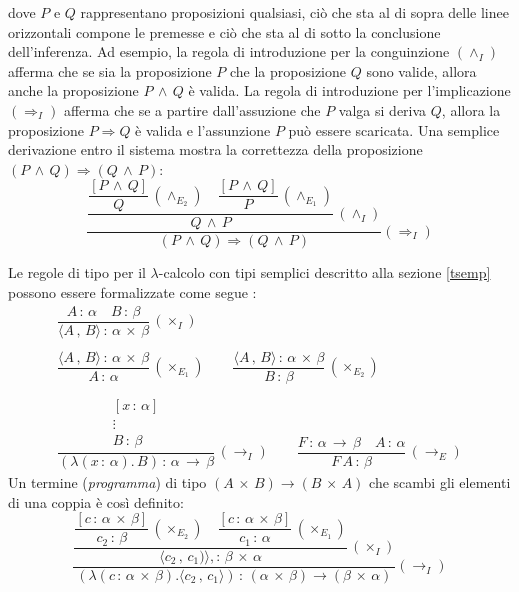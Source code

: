 dove $P$ e $Q$ rappresentano proposizioni qualsiasi, ciò che sta al di sopra delle linee orizzontali compone le premesse e ciò che sta al di sotto la conclusione dell'inferenza. Ad esempio, la regola di introduzione per la conguinzione $(\wedge_I)$ afferma che se sia la proposizione $P$ che la proposizione $Q$ sono valide, allora anche la proposizione $P \,\wedge\, Q$ è valida. La regola di introduzione per l'implicazione $(\Rightarrow_I)$ afferma che se a partire dall'assuzione che $P$ valga si deriva $Q$, allora la proposizione $P \Rightarrow Q$ è valida e l'assunzione $P$ può essere scaricata.
Una semplice derivazione entro il sistema mostra la correttezza della proposizione $(P \,\wedge\, Q) \Rightarrow (Q \,\wedge\, P)$:
\vspace{0.2cm}
$$
\dfrac{\dfrac{\dfrac{[P \,\wedge\, Q]}{Q}\,(\wedge_{E_2})\quad\dfrac{[P \,\wedge\, Q]}{P}\,(\wedge_{E_1})}{Q \,\wedge\, P}\,(\wedge_I)}{(P \,\wedge\, Q) \Rightarrow (Q \,\wedge\, P)}(\Rightarrow_I)
$$
\vspace{0.2cm}

Le regole di tipo per il $\lambda$-calcolo con tipi semplici descritto alla sezione \ref{tsemp} possono essere formalizzate come segue \cite{10.1145/2699407}:
\vspace{0.2cm}
$$
\begin{array}{ccc}
\dfrac{A \, : \, \alpha \quad B \, : \, \beta}{\langle A\, , \, B \rangle \, : \, \alpha \,\times\, \beta}\,(\times_I) \\ \\
\dfrac{\langle A\, , \, B \rangle \, : \, \alpha \,\times\, \beta}{A \, : \, \alpha}\,(\times_{E_1}) \qquad
\dfrac{\langle A\, , \, B \rangle \, : \, \alpha \,\times\, \beta}{B \, : \, \beta}\,(\times_{E_2}) \\ \\
\dfrac{\begin{array}{c}[x \, : \, \alpha] \\ \vdots \\  B \, : \, \beta\end{array}}{(\lambda (x \, : \, \alpha). \, B) \, : \, \alpha \,\to\, \beta}\,(\to_I) \qquad
\dfrac{F \, : \, \alpha \,\to\, \beta \quad A \, : \, \alpha}{F \, A \, : \, \beta}\,(\to_E)
\end{array}
$$
\vspace{0.2cm}
Un termine (\emph{programma}) di tipo $(A \,\times\, B) \to (B \,\times\,A)$ che scambi gli elementi di una coppia è così definito:
\vspace{0.2cm}
$$
\dfrac{\dfrac{\dfrac{[c \,:\, \alpha \,\times\, \beta]}{c_{2} \,:\, \beta}\,(\times_{E_2})\quad\dfrac{[c \,:\, \alpha \,\times\, \beta]}{c_{1} \,:\, \alpha}\,(\times_{E_1})}{\langle c_{2} \, , \, c_{1}) \rangle, : \, \beta \,\times\, \alpha}\,(\times_I)}{(\lambda(c \,:\, \alpha \,\times\, \beta).\langle c_{2} \, , \, c_{1} \rangle) \, : \, (\alpha \,\times\, \beta) \to (\beta \,\times\, \alpha)}(\to_I)
$$
\vspace{0.2cm}

